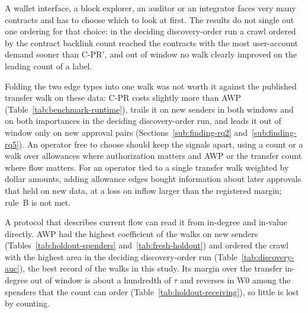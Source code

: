 A wallet interface, a block explorer, an auditor or an integrator faces very many contracts and has to choose which to look at first. The results do not single out one ordering for that choice: in the deciding discovery-order run a crawl ordered by the contract backlink count reached the contracts with the most user-account demand sooner than \mbox{C-PR}$'$, and out of window no walk clearly improved on the leading count of a label.


Folding the two edge types into one walk was not worth it against the published transfer walk on these data: \mbox{C-PR} costs slightly more than AWP (Table~\ref{tab:benchmark-runtime}), trails it on new senders in both windows and on both importances in the deciding discovery-order run, and leads it out of window only on new approval pairs (Sections~\ref{sub:finding-rq2} and~\ref{sub:finding-rq5}). An operator free to choose should keep the signals apart, using a count or a walk over allowances where authorization matters and AWP or the transfer count where flow matters. For an operator tied to a single transfer walk weighted by dollar amounts, adding allowance edges bought information about later approvals that held on new data, at a loss on inflow larger than the registered margin; rule~B is not met.


A protocol that describes current flow can read it from in-degree and in-value directly. AWP \parencite{do2023awp} had the highest coefficient of the walks on new senders (Tables~\ref{tab:holdout-spenders} and~\ref{tab:fresh-holdout}) and ordered the crawl with the highest area in the deciding discovery-order run (Table~\ref{tab:discovery-auc}), the best record of the walks in this study. Its margin over the transfer in-degree out of window is about a hundredth of $\tau$ and reverses in W0 among the spenders that the count can order (Table~\ref{tab:holdout-receiving}), so little is lost by counting.


